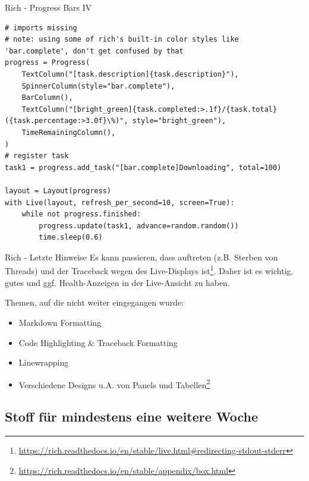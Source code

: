 \documentclass[12pt, aspectratio=169, usepdftitle=false, handout]{beamer}
\newcommand{\furl}[1]{\footnote{\url{#1}}}
\newcommand{\nll}[1]{\note{\LARGE{#1}}}
\begin{document}
\begin{frame}[fragile]{Rich - Progress Bars IV}
	\begin{lstlisting}[language=pytiny]
# imports missing
# note: using some of rich's built-in color styles like 'bar.complete', don't get confused by that
progress = Progress(
    TextColumn("[task.description]{task.description}"),
    SpinnerColumn(style="bar.complete"),
    BarColumn(),
    TextColumn("[bright_green]{task.completed:>.1f}/{task.total} ({task.percentage:>3.0f}\%)", style="bright_green"),
    TimeRemainingColumn(),
)
# register task
task1 = progress.add_task("[bar.complete]Downloading", total=100)

layout = Layout(progress)
with Live(layout, refresh_per_second=10, screen=True):
    while not progress.finished:
        progress.update(task1, advance=random.random())
        time.sleep(0.6)
\end{lstlisting}
\end{frame}


\begin{frame}{Rich - Letzte Hinweise}
		Es kann passieren, dass  auftreten (z.B. Sterben von Threads) und der Traceback wegen des Live-Displays  ist\furl{https://rich.readthedocs.io/en/stable/live.html\#redirecting-stdout-stderr}.
	\newline 
	Daher ist es wichtig, gutes  und ggf. Health-Anzeigen in der Live-Ansicht zu haben.
	
	\medskip
	
	Themen, auf die nicht weiter eingegangen wurde:
	\begin{itemize}
		\item Markdown Formatting
		\item Code Highlighting \& Traceback Formatting
		\item Linewrapping
		\item Verschiedene Designs u.A. von Panels und Tabellen\furl{https://rich.readthedocs.io/en/stable/appendix/box.html}
	\end{itemize}
\nll{Deadlocks aufpassen!}
\end{frame}


\framecardfragen

\subsection{Stoff für mindestens eine weitere Woche}
\end{document}
